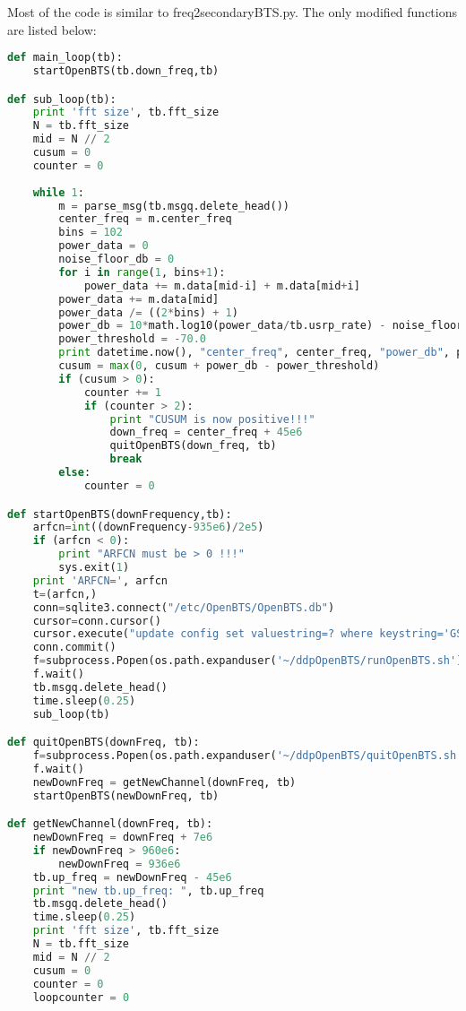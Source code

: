 Most of the code is similar to \textsf{freq2secondaryBTS.py}. The only modified 
functions are listed below:

\begin{lstlisting}[language=Python]
def main_loop(tb):
    startOpenBTS(tb.down_freq,tb)

def sub_loop(tb):
    print 'fft size', tb.fft_size
    N = tb.fft_size
    mid = N // 2
    cusum = 0
    counter = 0
    
    while 1:
        m = parse_msg(tb.msgq.delete_head())
        center_freq = m.center_freq
        bins = 102
        power_data = 0
        noise_floor_db = 0
        for i in range(1, bins+1):
            power_data += m.data[mid-i] + m.data[mid+i]
        power_data += m.data[mid]
        power_data /= ((2*bins) + 1)
        power_db = 10*math.log10(power_data/tb.usrp_rate) - noise_floor_db
        power_threshold = -70.0
        print datetime.now(), "center_freq", center_freq, "power_db", power_db
        cusum = max(0, cusum + power_db - power_threshold)
        if (cusum > 0):
            counter += 1
            if (counter > 2):
                print "CUSUM is now positive!!!"
                down_freq = center_freq + 45e6
                quitOpenBTS(down_freq, tb)
                break
        else:
            counter = 0

def startOpenBTS(downFrequency,tb):
    arfcn=int((downFrequency-935e6)/2e5)
    if (arfcn < 0):
        print "ARFCN must be > 0 !!!"
        sys.exit(1)
    print 'ARFCN=', arfcn
    t=(arfcn,)
    conn=sqlite3.connect("/etc/OpenBTS/OpenBTS.db")
    cursor=conn.cursor()
    cursor.execute("update config set valuestring=? where keystring='GSM.Radio.C0'",t)
    conn.commit()
    f=subprocess.Popen(os.path.expanduser('~/ddpOpenBTS/runOpenBTS.sh'))
    f.wait()
    tb.msgq.delete_head()
    time.sleep(0.25)
    sub_loop(tb)

def quitOpenBTS(downFreq, tb):
    f=subprocess.Popen(os.path.expanduser('~/ddpOpenBTS/quitOpenBTS.sh'))
    f.wait()    
    newDownFreq = getNewChannel(downFreq, tb)
    startOpenBTS(newDownFreq, tb)

def getNewChannel(downFreq, tb):
    newDownFreq = downFreq + 7e6
    if newDownFreq > 960e6:
        newDownFreq = 936e6
    tb.up_freq = newDownFreq - 45e6
    print "new tb.up_freq: ", tb.up_freq
    tb.msgq.delete_head()
    time.sleep(0.25)
    print 'fft size', tb.fft_size
    N = tb.fft_size
    mid = N // 2
    cusum = 0
    counter = 0
    loopcounter = 0


\end{lstlisting}
